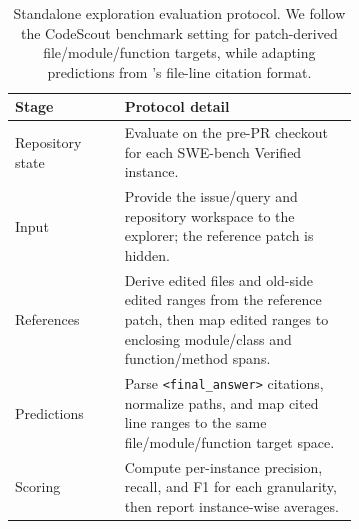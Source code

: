\begin{table}[t]
\centering
\caption{Standalone exploration evaluation protocol. We follow the CodeScout benchmark setting for patch-derived file/module/function targets, while adapting predictions from \approach's file-line citation format.}
\label{tab:explore-protocol}
\small
\setlength{\tabcolsep}{4pt}
\begin{tabular}{lp{0.68\linewidth}}
\toprule
\textbf{Stage} & \textbf{Protocol detail} \\
\midrule
Repository state & Evaluate on the pre-PR checkout for each SWE-bench Verified instance. \\
Input & Provide the issue/query and repository workspace to the explorer; the reference patch is hidden. \\
References & Derive edited files and old-side edited ranges from the reference patch, then map edited ranges to enclosing module/class and function/method spans. \\
Predictions & Parse \texttt{<final\_answer>} citations, normalize paths, and map cited line ranges to the same file/module/function target space. \\
Scoring & Compute per-instance precision, recall, and F1 for each granularity, then report instance-wise averages. \\
\bottomrule
\end{tabular}
\end{table}